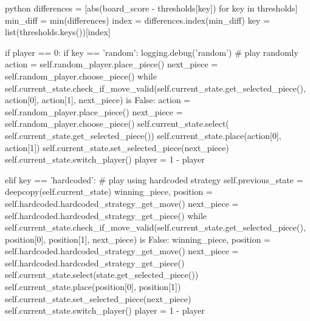 \begin{mintedbox}{python}
                differences = [abs(board_score - thresholds[key])
                                for key in thresholds]
                min_diff = min(differences)
                index = differences.index(min_diff)
                key = list(thresholds.keys())[index]

                if player == 0:
                    if key == 'random':
                        logging.debug('random')
                        # play randomly
                        action = self.random_player.place_piece()
                        next_piece = self.random_player.choose_piece()
                        while self.current_state.check_if_move_valid(self.current_state.get_selected_piece(), action[0], action[1], next_piece) is False:
                            action = self.random_player.place_piece()
                            next_piece = self.random_player.choose_piece()
                        self.current_state.select(
                            self.current_state.get_selected_piece())
                        self.current_state.place(action[0], action[1])
                        self.current_state.set_selected_piece(next_piece)
                        self.current_state.switch_player()
                        player = 1 - player

                    elif key == 'hardcoded':
                        # play using hardcoded strategy
                        self.previous_state = deepcopy(self.current_state)
                        winning_piece, position = self.hardcoded.hardcoded_strategy_get_move()
                        next_piece = self.hardcoded.hardcoded_strategy_get_piece()
                        while self.current_state.check_if_move_valid(self.current_state.get_selected_piece(), position[0], position[1], next_piece) is False:
                            winning_piece, position = self.hardcoded.hardcoded_strategy_get_move()
                            next_piece = self.hardcoded.hardcoded_strategy_get_piece()
                        self.current_state.select(state.get_selected_piece())
                        self.current_state.place(position[0], position[1])
                        self.current_state.set_selected_piece(next_piece)
                        self.current_state.switch_player()
                        player = 1 - player


\end{mintedbox}
